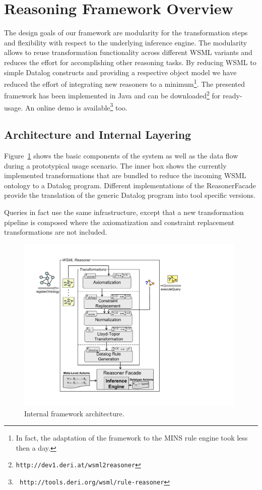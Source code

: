 \section{Reasoning Framework Overview\label{sec:framework}}

The design goals of our framework are modularity for the
transformation steps and flexibility with respect to the
underlying inference engine. The modularity allows to reuse
transformation functionality across different WSML variants and
reduces the effort for accomplishing other reasoning tasks. By
reducing WSML to simple Datalog constructs and providing a
respective object model we have reduced the effort of integrating
new reasoners to a minimum\footnote{In fact, the adaptation of the
framework to the MINS rule engine took less then a day.}. The
presented framework has been implemented in Java and can be
downloaded\footnote{{\tt http://dev1.deri.at/wsml2reasoner}} for
ready-usage. An online demo is available\footnote{\tt
http://tools.deri.org/wsml/rule-reasoner} too.


\subsection{Architecture and Internal Layering}
Figure~\ref{fig:layering} shows the basic components of the system
 as well as the
data flow during a prototypical usage scenario. The inner box
shows the currently implemented transformations that are bundled
to reduce the incoming WSML ontology to a Datalog program.
Different implementations of the ReasonerFacade provide the
translation of the generic Datalog program into tool specific
versions.

Queries in fact use the same infrastructure, except that a new transformation pipeline is
composed where the axiomatization and constraint replacement transformations are not included.

%

\begin{figure}[h]
    \includegraphics[width=11cm]{figures/layering}
    \centering
    \caption{Internal framework architecture. \label{fig:layering}}
\end{figure}



